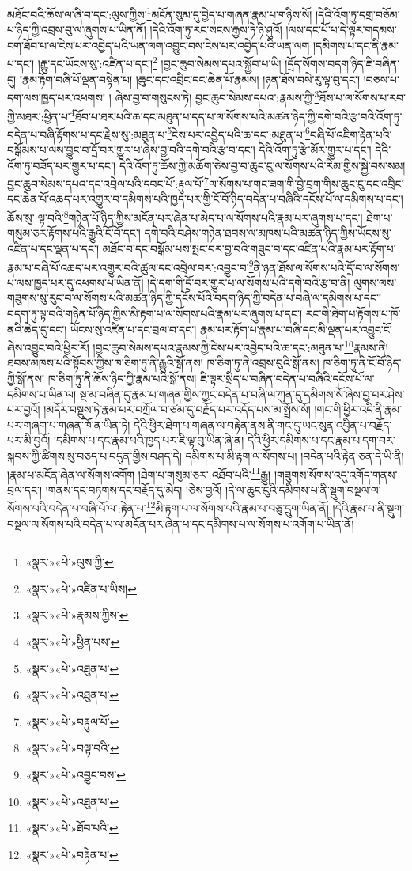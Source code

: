 མཐོང་བའི་ཆོས་ལ་ཞི་བ་དང་:ལུས་ཀྱིས་\footnote{«སྣར་»«པེ་»ལུས་ཀྱི་}མངོན་སུམ་དུ་བྱེད་པ་གཞན་རྣམ་པ་གཉིས་སོ། །དེའི་འོག་ཏུ་དགྲ་བཅོམ་པ་ཉིད་ཀྱི་འབྲས་བུ་ལ་ཞུགས་པ་ཡིན་ནོ། །དེའི་འོག་ཏུ་རང་སངས་རྒྱས་ཏེ་ཉི་ཤུའོ། །ལས་དང་པོ་པ་དེ་ལྟར་གདམས་ངག་ཐོབ་པ་ལ་ངེས་པར་འབྱེད་པའི་ཡན་ལག་འབྱུང་བས་ངེས་པར་འབྱེད་པའི་ཡན་ལག །དམིགས་པ་དང་ནི་རྣམ་པ་དང་། །རྒྱུ་དང་ཡོངས་སུ་:འཛིན་པ་དང་།\footnote{«སྣར་»«པེ་»འཛིན་པ་ཡིས།} །བྱང་ཆུབ་སེམས་དཔའ་སྐྱོབ་པ་ཡི། །དྲོད་སོགས་བདག་ཉིད་ཇི་བཞིན་དུ། །རྣམ་རྟོག་བཞི་པོ་ལྡན་བསྟེན་པ། །ཆུང་དང་འབྲིང་དང་ཆེན་པོ་རྣམས། །ཉན་ཐོས་བསེ་རུ་ལྟ་བུ་དང་། །བཅས་པ་དག་ལས་ཁྱད་པར་འཕགས། །
ཞེས་བྱ་བ་གསུངས་ཏེ། བྱང་ཆུབ་སེམས་དཔའ་:རྣམས་ཀྱི་\footnote{«སྣར་»«པེ་»རྣམས་ཀྱིས་}ཐོས་པ་ལ་སོགས་པ་རབ་ཀྱི་མཐར་:ཕྱིན་པ་\footnote{«སྣར་»«པེ་»ཕྱིན་པས་}ཐོབ་པ་ཐར་པའི་ཆ་དང་མཐུན་པ་དད་པ་ལ་སོགས་པའི་མཚན་ཉིད་ཀྱི་དགེ་བའི་རྩ་བའི་འོག་ཏུ་བདེན་པ་བཞི་རྟོགས་པ་དང་རྗེས་སུ་:མཐུན་པ་\footnote{«སྣར་»«པེ་»འཐུན་པ་}ངེས་པར་འབྱེད་པའི་ཆ་དང་:མཐུན་པ་\footnote{«སྣར་»«པེ་»འཐུན་པ་}བཞི་པོ་འཇིག་རྟེན་པའི་བསྒོམས་པ་ལས་བྱུང་བ་དྲོ་བར་གྱུར་པ་ཞེས་བྱ་བའི་དགེ་བའི་རྩ་བ་དང་། དེའི་འོག་ཏུ་རྩེ་མོར་གྱུར་པ་དང་། དེའི་འོག་ཏུ་བཟོད་པར་གྱུར་པ་དང་། དེའི་འོག་ཏུ་ཆོས་ཀྱི་མཆོག་ཅེས་བྱ་བ་ཆུང་ངུ་ལ་སོགས་པའི་རིམ་གྱིས་སྐྱེ་བས་སམ། བྱང་ཆུབ་སེམས་དཔའ་དང་འབྲེལ་པའི་དབང་པོ་:རྟུལ་པོ་\footnote{«སྣར་»«པེ་»བརྟུལ་པོ་}ལ་སོགས་པ་གང་ཟག་གི་བྱེ་བྲག་གིས་ཆུང་ངུ་དང་འབྲིང་དང་ཆེན་པོ་འཆད་པར་འགྱུར་བ་དམིགས་པའི་ཁྱད་པར་གྱི་ངོ་བོ་ཉིད་བདེན་པ་བཞིའི་དངོས་པོ་ལ་དམིགས་པ་དང་། ཆོས་སུ་:ལྟ་བའི་\footnote{«སྣར་»«པེ་»བལྟ་བའི་}གཉེན་པོ་ཉིད་ཀྱིས་མངོན་པར་ཞེན་པ་མེད་པ་ལ་སོགས་པའི་རྣམ་པར་ཞུགས་པ་དང་། ཐེག་པ་གསུམ་ཅར་རྟོགས་པའི་རྒྱུའི་ངོ་བོ་དང་། དགེ་བའི་བཤེས་གཉེན་ཐབས་ལ་མཁས་པའི་མཚན་ཉིད་ཀྱིས་ཡོངས་སུ་འཛིན་པ་དང་ལྡན་པ་དང་། མཐོང་བ་དང་བསྒོམ་པས་སྤང་བར་བྱ་བའི་གཟུང་བ་དང་འཛིན་པའི་རྣམ་པར་རྟོག་པ་རྣམ་པ་བཞི་པོ་འཆད་པར་འགྱུར་བའི་ཚུལ་དང་འབྲེལ་བར་:འབྱུང་བ་\footnote{«སྣར་»«པེ་»འབྱུང་བས་}ནི་ཉན་ཐོས་ལ་སོགས་པའི་དྲོ་བ་ལ་སོགས་པ་ལས་ཁྱད་པར་དུ་འཕགས་པ་ཡིན་ནོ། །དེ་དག་གི་དྲོ་བར་གྱུར་པ་ལ་སོགས་པའི་དགེ་བའི་རྩ་བ་ནི། ལུགས་ལས་གཟུགས་སུ་རུང་བ་ལ་སོགས་པའི་མཚན་ཉིད་ཀྱི་དངོས་པོའི་བདག་ཉིད་ཀྱི་བདེན་པ་བཞི་ལ་དམིགས་པ་དང་། བདག་ཏུ་ལྟ་བའི་གཉེན་པོ་ཉིད་ཀྱིས་མི་རྟག་པ་ལ་སོགས་པའི་རྣམ་པར་ཞུགས་པ་དང་། རང་གི་ཐེག་པ་རྟོགས་པ་ཁོ་ནའི་ཆེད་དུ་དང་། ཡོངས་སུ་འཛིན་པ་དང་བྲལ་བ་དང་། རྣམ་པར་རྟོག་པ་རྣམ་པ་བཞི་དང་མི་ལྡན་པར་འབྱུང་ངོ་ཞེས་འབྱུང་བའི་ཕྱིར་རོ། །བྱང་ཆུབ་སེམས་དཔའ་རྣམས་ཀྱི་ངེས་པར་འབྱེད་པའི་ཆ་དང་:མཐུན་པ་\footnote{«སྣར་»«པེ་»འཐུན་པ་}རྣམས་ནི། ཐབས་མཁས་པའི་སྟོབས་ཀྱིས་ཁ་ཅིག་ཏུ་ནི་རྒྱུའི་སྒོ་ནས། ཁ་ཅིག་ཏུ་ནི་འབྲས་བུའི་སྒོ་ནས། ཁ་ཅིག་ཏུ་ནི་ངོ་བོ་ཉིད་ཀྱི་སྒོ་ནས། ཁ་ཅིག་ཏུ་ནི་ཆོས་ཉིད་ཀྱི་རྣམ་པའི་སྒོ་ནས། ཇི་ལྟར་སྲིད་པ་བཞིན་བདེན་པ་བཞིའི་དངོས་པོ་ལ་དམིགས་པ་ཡིན་ལ། སྔ་མ་བཞིན་དུ་རྣམ་པ་གཞན་གྱིས་ཀྱང་བདེན་པ་བཞི་ལ་ཀུན་དུ་དམིགས་སོ་ཞེས་བྱ་བར་ཤེས་པར་བྱའོ། །མདོར་བསྡུས་ཏེ་རྣམ་པར་བཀྲོལ་བ་ཙམ་དུ་བརྗོད་པར་འདོད་པས་མ་སྤྲོས་སོ། །གང་གི་ཕྱིར་འདི་ནི་རྣམ་པར་གཞག་པ་གཞན་ཁོ་ན་ཡིན་ཏེ། དེའི་ཕྱིར་ཐེག་པ་གཞན་ལ་བརྟེན་ནས་ནི་གང་དུ་ཡང་སུན་འབྱིན་པ་བརྗོད་པར་མི་བྱའོ། །དམིགས་པ་དང་རྣམ་པའི་ཁྱད་པར་ཇི་ལྟ་བུ་ཡིན་ཞེ་ན། དེའི་ཕྱིར་དམིགས་པ་དང་རྣམ་པ་དག་བར་སྐབས་ཀྱི་ཚིགས་སུ་བཅད་པ་བདུན་གྱིས་བཤད་དེ། དམིགས་པ་མི་རྟག་ལ་སོགས་པ། །བདེན་པའི་རྟེན་ཅན་དེ་ཡི་ནི། །རྣམ་པ་མངོན་ཞེན་ལ་སོགས་འགོག །ཐེག་པ་གསུམ་ཅར་:འཐོབ་པའི་\footnote{«སྣར་»«པེ་»ཐོབ་པའི་}རྒྱུ། །གཟུགས་སོགས་འདུ་འགོད་གནས་བྲལ་དང་། །གནས་དང་བཏགས་དང་བརྗོད་དུ་མེད། །ཅེས་བྱའོ། །དེ་ལ་ཆུང་ངུའི་དམིགས་པ་ནི་སྡུག་བསྔལ་ལ་སོགས་པའི་བདེན་པ་བཞི་པོ་ལ་:རྟེན་པ་\footnote{«སྣར་»«པེ་»བརྟེན་པ་}མི་རྟག་པ་ལ་སོགས་པའི་རྣམ་པ་བཅུ་དྲུག་ཡིན་ནོ། །དེའི་རྣམ་པ་ནི་སྡུག་བསྔལ་ལ་སོགས་པའི་བདེན་པ་ལ་མངོན་པར་ཞེན་པ་དང་དམིགས་པ་ལ་སོགས་པ་འགོག་པ་ཡིན་ནོ། 